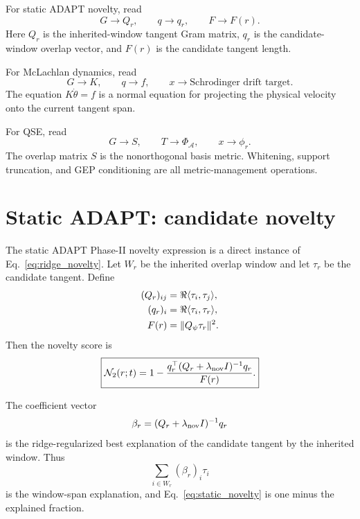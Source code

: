 \documentclass[10pt,twocolumn]{article}
\newcommand{\nov}{\mathcal N}
\begin{document}
\begin{paperbox}
For static ADAPT novelty, read
\[
G\to Q_r,
\qquad q\to q_r,
\qquad F\to F(r).
\]
Here $Q_r$ is the inherited-window tangent Gram matrix, $q_r$ is the candidate-window overlap vector, and $F(r)$ is the candidate tangent length.
\end{paperbox}

\begin{paperbox}
For McLachlan dynamics, read
\[
G\to K,
\qquad q\to f,
\qquad x\to \text{Schrodinger drift target}.
\]
The equation $K\dot\theta=f$ is a normal equation for projecting the physical velocity onto the current tangent span.
\end{paperbox}

\begin{paperbox}
For QSE, read
\[
G\to S,
\qquad T\to \Phi_{\mathcal A},
\qquad x\to \phi_r.
\]
The overlap matrix $S$ is the nonorthogonal basis metric. Whitening, support truncation, and GEP conditioning are all metric-management operations.
\end{paperbox}

\section{Static ADAPT: candidate novelty}

The static ADAPT Phase-II novelty expression is a direct instance of Eq.~\eqref{eq:ridge_novelty}. Let $W_r$ be the inherited overlap window and let $\tau_r$ be the candidate tangent. Define
\begin{align}
(Q_r)_{ij}&=\Re\langle \tau_i,\tau_j\rangle,\notag\\
(q_r)_i&=\Re\langle \tau_i,\tau_r\rangle,\notag\\
F(r)&=\|Q_\psi\tau_r\|^2.
\label{eq:static_translation}
\end{align}
Then the novelty score is
\begin{equation}
\boxed{
\nov_2(r;t)
=1-\frac{q_r^\top(Q_r+\lambda_{\rm nov}I)^{-1}q_r}{F(r)}.
}
\label{eq:static_novelty}
\end{equation}

The coefficient vector
\begin{equation}
\beta_r=(Q_r+\lambda_{\rm nov}I)^{-1}q_r
\label{eq:static_beta}
\end{equation}
is the ridge-regularized best explanation of the candidate tangent by the inherited window. Thus
\begin{equation}
\sum_{i\in W_r}(\beta_r)_i\tau_i
\label{eq:static_window_fit}
\end{equation}
is the window-span explanation, and Eq.~\eqref{eq:static_novelty} is one minus the explained fraction.
\end{document}

